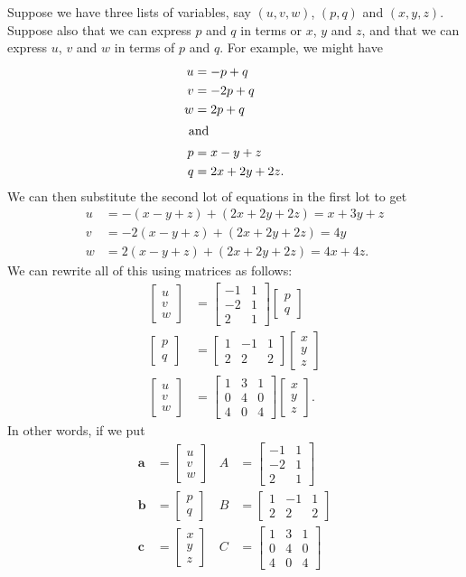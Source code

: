 \documentclass[a4paper]{book}
\newcommand{\bbm}       {\begin{bmatrix}}
\newcommand{\ebm}       {\end{bmatrix}}
\newcommand{\VEC}[1]    {\mathbf{#1}}
\renewcommand{\:}{\colon}
\theoremstyle{definition}
\begin{document}
Suppose we have three lists of variables, say $(u,v,w)$, $(p,q)$ and
$(x,y,z)$.  Suppose also that we can express $p$ and $q$ in terms or
$x$, $y$ and $z$, and that we can express $u$, $v$ and $w$ in terms of
$p$ and $q$.  For example, we might have
\begin{align*}
 u &= -p+q \\
 v &= -2p+q \\
 w &= 2p+q \\
 \intertext{ and }
 p &= x-y+z \\
 q &= 2x+2y+2z.
\end{align*}
We can then substitute the second lot of equations in the first lot to
get 
\begin{align*}
 u &= -(x-y+z)  + (2x+2y+2z) = x+3y+z \\
 v &= -2(x-y+z) + (2x+2y+2z) = 4y \\
 w &=  2(x-y+z) + (2x+2y+2z) = 4x + 4z.
\end{align*}
We can rewrite all of this using matrices as follows:
\begin{align*}
 \bbm u\\ v\\ w\ebm &= \bbm -1&1 \\ -2&1 \\ 2&1\ebm \bbm p\\ q\ebm \\
 \bbm p \\ q\ebm &= \bbm 1&-1&1 \\ 2&2&2 \ebm \bbm x\\ y\\ z\ebm \\
 \bbm u\\ v\\ w\ebm &= \bbm 1&3&1 \\ 0&4&0 \\ 4&0&4 \ebm
                       \bbm x\\ y\\ z\ebm.
\end{align*}
In other words, if we put
\begin{align*}
 \VEC{a} &= \bbm u\\ v\\ w\ebm & A &= \bbm -1&1\\ -2&1\\ 2&1\ebm \\
 \VEC{b} &= \bbm p\\ q\ebm & B &= \bbm 1&-1&1\\ 2&2&2\ebm \\
 \VEC{c} &= \bbm x\\ y\\ z\ebm & C &= \bbm 1&3&1 \\ 0&4&0 \\ 4&0&4 \ebm 
\end{align*}
\end{document}
